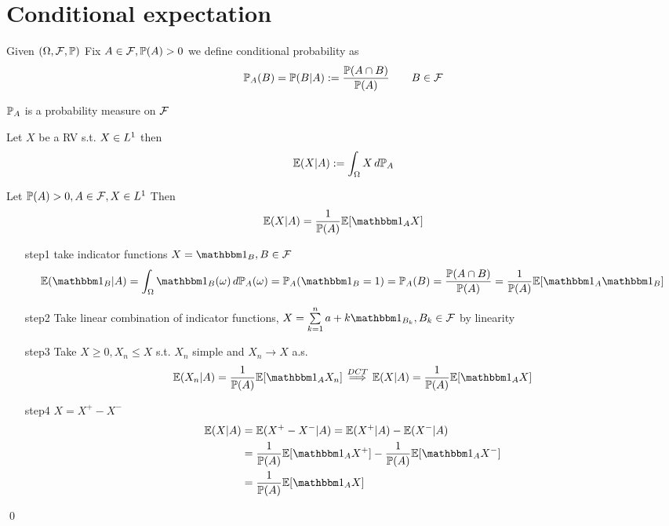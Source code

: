 \newpage
\section{Conditional expectation}
Given $(\Omega, \mathcal{F}, \mathbb{P})$ Fix $A\in \mathcal{F}, \mathbb{P}(A)>0$ we define conditional probability as
\begin{equation*}
    \mathbb{P}_A(B) = \mathbb{P}(B|A) := \frac{\mathbb{P}(A\cap B)}{\mathbb{P}(A)} \qquad B\in \mathcal{F}
\end{equation*}
\begin{lem}
$\mathbb{P}_A$ is a probability measure on $\mathcal{F}$
\end{lem}

\begin{dfn}
Let $X$ be a RV s.t. $X\in L^{1}$ then \begin{equation*}
    \mathbb{E}(X|A) := \int_{\Omega} X \mathop{}\!d\mathbb{P}_A
\end{equation*}
\end{dfn}
\begin{thm}
Let $\mathbb{P}(A)>0, A\in \mathcal{F}, X\in L^{1}$ Then
\begin{equation*}
    \E(X|A) = \frac{1}{\prob(A)}\E[\I_A X]
\end{equation*}
\end{thm}
\pf
\begin{enumerate}
    \item[step1] take indicator functions $X= \I_B, B\in \F$
\begin{equation*}
    \E(\I_B|A) = \into \I_B(\omega) \diff\prob_A(\omega) = \prob_A(\I_B = 1) = \prob_A(B) = \frac{\prob(A\cap B)}{\prob(A)} = \frac{1}{\prob(A)}\E[\I_A \I_B]
\end{equation*}
    \item[step2] Take linear combination of indicator functions, $X= \bigs{k=1}^n a+k \I_{B_k}, B_k\in \F$ by linearity
    \item[step3] Take $X\geq 0, X_n\leq X$ s.t. $X_n$ simple and $X_n \rightarrow X$ a.s.
    \begin{equation*}
        \E(X_n|A) = \frac{1}{\prob(A)}\E[\I_A X_n] \stackrel{DCT }{\implies}  \E(X|A) = \frac{1}{\prob(A)}\E[\I_A X]
    \end{equation*}
    \item[step4] $X = X^+ - X^-$
    \begin{align*}
        \E(X|A) &= \E(X^+ - X^-|A) = \E(X^+|A) -\E(X^-|A) \\
        &= \frac{1}{\prob(A)}\E[\I_A X^+] - \frac{1}{\prob(A)}\E[\I_A X^-] \\
        &= \frac{1}{\prob(A)}\E[\I_A X]
    \end{align*}
\end{enumerate}\qed

